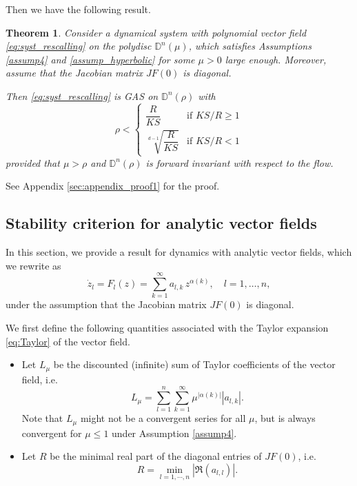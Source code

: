 \documentclass{article}
\newtheorem{theorem}{Theorem}
\begin{document}
Then we have the following result.
\begin{theorem}\label{thm:poly}
Consider a dynamical system with polynomial vector field \eqref{eq:syst_rescalling} on the polydisc $\mathbb{D}^n(\mu)$, which satisfies Assumptions \ref{assump4} and \ref{assump_hyperbolic} for some $\mu>0$ large enough. Moreover, assume that the Jacobian matrix $JF(0)$ is diagonal.

 Then \eqref{eq:syst_rescalling} is GAS on $\mathbb{D}^n(\rho)$ with
 \begin{equation*}
   \rho < \begin{cases}   \dfrac{R}{KS} & \textrm{if } KS/R \geq 1 \\
    \sqrt[d-1]{\dfrac{R}{KS}} & \textrm{if } KS/R < 1
   \end{cases}
 \end{equation*}
provided that $\mu>\rho$ and $\mathbb{D}^n\left(\rho\right)$ is forward invariant with respect to the flow.
 
\end{theorem}

See Appendix \ref{sec:appendix_proof1} for the proof.

\subsection{Stability criterion for analytic vector fields}

In this section, we provide a result for dynamics with analytic vector fields, which we rewrite as
\begin{equation}\label{eq:syst_rescalling_2}
\dot{z}_l=F_l(z)=\sum_{k=1}^\infty a_{l,k} \, z^{\alpha(k)}, \quad l=1,\dots,n,
\end{equation}
under the assumption that the  Jacobian matrix $JF(0)$ is diagonal.


We first define the following quantities associated with the Taylor expansion \eqref{eq:Taylor} of the vector field.
\begin{itemize}
        \item Let $L_\mu$ be the discounted (infinite) sum of Taylor coefficients of the vector field, i.e.
        \begin{equation}\label{eq:cond_thrm2}
L_\mu=\sum_{l=1}^n  \sum_{k=1}^\infty \mu^{\vert \alpha(k) \vert} \left| a_{l,k}\right| .
\end{equation}
Note that $L_\mu$ might not be a convergent series for all $\mu$, but is always convergent for $\mu \leq 1$ under Assumption \ref{assump4}.
\item Let $R$ be the minimal real part of the diagonal entries of $JF(0)$, i.e.
\begin{equation*}
R=\min_{l=1,\cdots,n}   \left|\Re\left(a_{l,l}\right)\right|.
\end{equation*}
\end{itemize}
\end{document}
